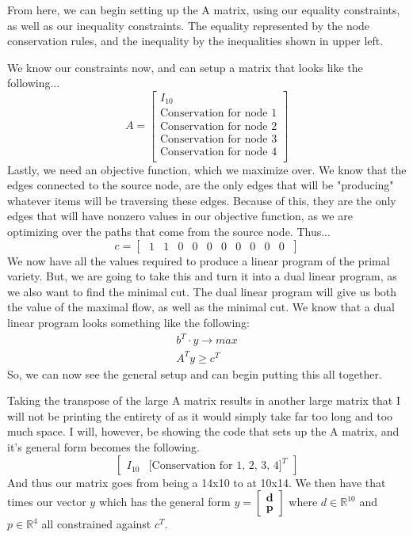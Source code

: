 \documentclass[11pt]{article}
\begin{document}
    From here, we can begin setting up the A matrix, using our equality
    constraints, as well as our inequality constraints. The equality
    represented by the node conservation rules, and the inequality by the
    inequalities shown in upper left.

    \newpage

    We know our constraints now, and can setup a matrix that looks like the
    following...
    \[
        A=
        \begin{bmatrix}
            I_{10}    \\
            \text{Conservation for node 1}  \\
            \text{Conservation for node 2}  \\
            \text{Conservation for node 3}  \\
            \text{Conservation for node 4}  \\
        \end{bmatrix}
    \]
    Lastly, we need an objective function, which we maximize over. We know that
    the edges connected to the source node, are the only edges that will be
    "producing" whatever items will be traversing these edges. Because of this,
    they are the only edges that will have nonzero values in our objective
    function, as we are optimizing over the paths that come from the source
    node. Thus...
    \[
        c=\begin{bmatrix}\; 1 & 1 & 0 & 0 & 0 & 0 & 0 & 0 & 0 & 0\; \end{bmatrix}
    \]
    We now have all the values required to produce a linear program of the
    primal variety. But, we are going to take this and turn it into a dual
    linear program, as we also want to find the minimal cut. The dual linear
    program will give us both the value of the maximal flow, as well as the
    minimal cut. We know that a dual linear program looks something like the
    following:
    \begin{align*}
       b^T \cdot {y} \rightarrow {max} \\
       A^T y \geq c^T
    \end{align*}
    So, we can now see the general setup and can begin putting this all
    together. 

    Taking the transpose of the large A matrix results in another large matrix
    that I will not be printing the entirety of as it would simply take far too
    long and too much space. I will, however, be showing the code that sets up
    the A matrix, and it's general form becomes the following.
    \[
        \begin{bmatrix}
            I_{10}  &   \text{[Conservation for 1, 2, 3, 4$]^T$}
        \end{bmatrix}
    \]
    And thus our matrix goes from being a 14x10 to at 10x14. We then have that
    times our vector $y$ which has the general form $y=\begin{bmatrix}
    \textbf{d} \\ \textbf{p} \end{bmatrix}$ where $d \in \mathbb{R}^{10}$ and $p
    \in \mathbb{R}^4$ all constrained against $c^T$.
\end{document}
